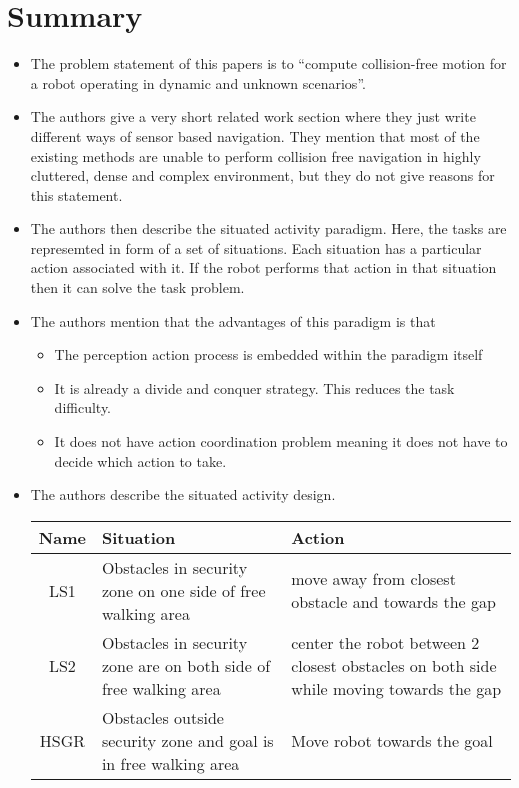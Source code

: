 \documentclass[12pt]{article}
\begin{document}
\section{Summary}
\begin{itemize}
    \item The problem statement of this papers is to ``compute collision-free motion for a robot operating in dynamic and unknown scenarios''\cite{minguez2004nearness}.
    \item The authors give a very short related work section where they just write different ways of sensor based navigation. They mention that most of the existing methods are unable to perform collision free navigation in highly cluttered, dense and complex environment, but they do not give reasons for this statement.
    \item The authors then describe the situated activity paradigm. Here, the tasks are represemted in form of a set of situations. Each situation has a particular action associated with it. If the robot performs that action in that situation then it can solve the task problem.
    \item The authors mention that the advantages of this paradigm is that 
        \begin{itemize}
            \item The perception action process is embedded within the paradigm itself
            \item It is already a divide and conquer strategy. This reduces the task difficulty.
            \item It does not have action coordination problem meaning it does not have to decide which action to take.
        \end{itemize}
    \item The authors describe the situated activity design.\\
        \begin{tabular}{|c|p{6cm}|p{6cm}|}\hline
            \textbf{Name} & \textbf{Situation} & \textbf{Action}\\\hline
            LS1 & Obstacles in security zone on one side of free walking area & move away from closest obstacle and towards the gap \\\hline
            LS2 & Obstacles in security zone are on both side of free walking area & center the robot between 2 closest obstacles on both side while moving towards the gap \\\hline
            HSGR & Obstacles outside security zone and goal is in free walking area & Move robot towards the goal \\\hline

\end{tabular}
\end{itemize}
\end{document}
